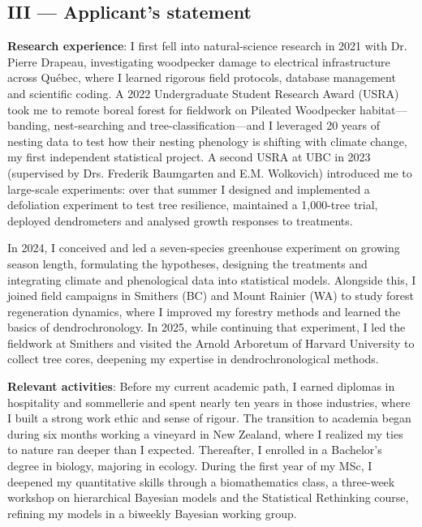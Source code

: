 \documentclass[12pt]{article}
\begin{document}
\subsection*{III --- Applicant's statement}

\textbf{Research experience}:
I first fell into natural-science research in 2021 with Dr. Pierre Drapeau, investigating woodpecker damage to electrical infrastructure across Québec, where I learned rigorous field protocols, database management and scientific coding. A 2022 Undergraduate Student Research Award (USRA) took me to remote boreal forest for fieldwork on Pileated Woodpecker habitat---banding, nest-searching and tree-classification---and I leveraged 20 years of nesting data to test how their nesting phenology is shifting with climate change, my first independent statistical project. A second USRA at UBC in 2023 (supervised by Drs. Frederik Baumgarten and E.M. Wolkovich) introduced me to large-scale experiments: over that summer I designed and implemented a defoliation experiment to test tree resilience, maintained a 1,000-tree trial, deployed dendrometers and analysed growth responses to treatments.

In 2024, I conceived and led a seven-species greenhouse experiment on growing season length, formulating the hypotheses, designing the treatments and integrating climate and phenological data into statistical models. Alongside this, I joined field campaigns in Smithers (BC) and Mount Rainier (WA) to study forest regeneration dynamics, where I improved my forestry methods and learned the basics of dendrochronology. In 2025, while continuing that experiment, I led the fieldwork at Smithers and visited the Arnold Arboretum of Harvard University to collect tree cores, deepening my expertise in dendrochronological methods.

\textbf{Relevant activities}:
Before my current academic path, I earned diplomas in hospitality and sommellerie and spent nearly ten years in those industries, where I built a strong work ethic and sense of rigour. The transition to academia began during six months working a vineyard in New Zealand, where I realized my ties to nature ran deeper than I expected. Thereafter, I enrolled in a Bachelor's degree in biology, majoring in ecology. During the first year of my MSc, I deepened my quantitative skills through a biomathematics class, a three-week workshop on hierarchical Bayesian models and the Statistical Rethinking course, refining my models in a biweekly Bayesian working group.
\end{document}
